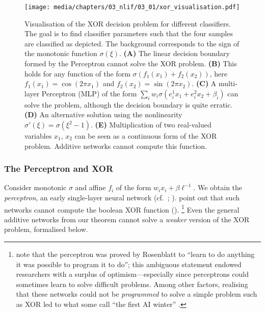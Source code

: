 \begin{figure}
	\centering
	\texttt{[image: media/chapters/03\_nlif/03\_01/xor\_visualisation.pdf]}%
	{\label{fig:xor_visualisation_a}}%
	{\label{fig:xor_visualisation_b}}%
	{\label{fig:xor_visualisation_c}}%
	{\label{fig:xor_visualisation_d}}%
	{\label{fig:xor_visualisation_e}}%
	\caption[Visualisation of the XOR decision problem for different classifiers]{Visualisation of the XOR decision problem for different classifiers. The goal is to find classifier parameters such that the four samples are classified as depicted.
	The background corresponds to the sign of the monotonic function $\sigma(\xi)$.
	\textbf{(A)} The linear decision boundary formed by the Perceptron cannot solve the XOR problem.
	\textbf{(B)} This holds for any function of the form $\sigma(f_1(x_1) + f_2(x_2))$, here $f_1(x_1) = \cos(2\pi x_1)$ and $f_2(x_2) = \sin(2\pi x_2)$.
	\textbf{(C)} A multi-layer Perceptron (MLP) of the form $\sum_i w_i \sigma(e_i^1 x_1 + e_i^2 x_2 + \beta_i )$ can solve the problem, although the decision boundary is quite erratic.
	\textbf{(D)} An alternative solution using the nonlinearity $\sigma'(\xi) = \sigma(\xi^2 - 1)$.
	\textbf{(E)} Multiplication of two real-valued variables $x_1$, $x_2$ can be seen as a continuous form of the XOR problem.
	Additive networks cannot compute this function.
	}
	\label{fig:xor_visualisation}
\end{figure}

\subsubsection{The Perceptron and XOR}
Consider monotonic $\sigma$ and affine $f_i$ of the form $w_i x_i + \beta \ell^{-1}$.
We obtain the \emph{perceptron}, an early single-layer neural network (cf.~; \cite{rosenblatt1958perceptron}).
 point out that such networks cannot compute the boolean XOR function ().%
\footnote{ note that the perceptron was proved by Rosenblatt to \enquote{learn to do anything it was possible to program it to do}; this ambiguous statement endowed researchers with a surplus of optimism---especially since perceptrons could sometimes learn to solve difficult problems.
Among other factors, realising that these networks could not be \emph{programmed} to solve a simple problem such as XOR led to what some call \enquote{the first AI winter} \citep[e.g.,][]{muthukrishnan2020brief}.}
Even the general additive networks from our theorem cannot solve a \emph{weaker} version of the XOR problem, formalised below.

